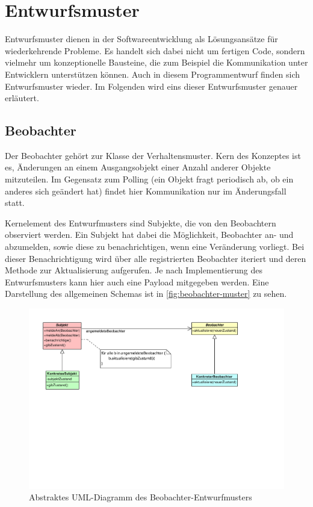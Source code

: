 \chapter{Entwurfsmuster}
Entwurfsmuster dienen in der Softwareentwicklung als Lösungsansätze für wiederkehrende Probleme.
Es handelt sich dabei nicht um fertigen Code, sondern vielmehr um konzeptionelle Bausteine, die zum Beispiel die Kommunikation unter Entwicklern unterstützen können.
Auch in diesem Programmentwurf finden sich Entwurfsmuster wieder.
Im Folgenden wird eins dieser Entwurfsmuster genauer erläutert.

\section{Beobachter}
Der Beobachter gehört zur Klasse der Verhaltensmuster.
Kern des Konzeptes ist es, Änderungen an einem Ausgangsobjekt einer Anzahl anderer Objekte mitzuteilen.
Im Gegensatz zum Polling (ein Objekt fragt periodisch ab, ob ein anderes sich geändert hat) findet hier Kommunikation nur im Änderungsfall statt.

Kernelement des Entwurfmusters sind Subjekte, die von den Beobachtern observiert werden.
Ein Subjekt hat dabei die Möglichkeit, Beobachter an- und abzumelden, sowie diese zu benachrichtigen, wenn eine Veränderung vorliegt.
Bei dieser Benachrichtigung wird über alle registrierten Beobachter iteriert und deren Methode zur Aktualisierung aufgerufen.
Je nach Implementierung des Entwurfsmusters kann hier auch eine Payload mitgegeben werden.
Eine Darstellung des allgemeinen Schemas ist in \autoref{fig:beobachter-muster} zu sehen.

\begin{figure}
    \centering
    \includegraphics[width=\textwidth, trim = 0cm 10cm 3.5cm 0cm]{../VPP/Beobachter-Muster.pdf}
    \caption{Abstraktes UML-Diagramm des Beobachter-Entwurfmusters}
    \label{fig:beobachter-muster}
\end{figure}

